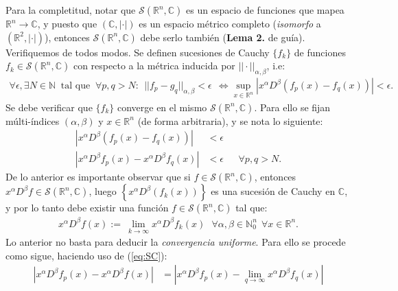 \documentclass[spanish, fleqn]{article}
\begin{document}
\begin{description}
\begin{enumerate}
        Para la completitud, notar que $\mathcal{S}(\mathbb{R}^n, \mathbb{C})$ es un espacio de funciones que mapea $\mathbb{R}^n \rightarrow \mathbb{C}$, y puesto que $(\mathbb{C},|\cdot|)$ es un espacio métrico completo  (\textit{isomorfo} a $\left(\mathbb{R}^2,|\cdot|\right)$), entonces $\mathcal{S}(\mathbb{R}^n, \mathbb{C})$ debe serlo también (\textbf{Lema 2.} de guía). Verifiquemos de todos modos. Se definen sucesiones de Cauchy $\{f_k \}$ de funciones $f_k \in \mathcal{S}(\mathbb{R}^n,\mathbb{C})$ con respecto a la métrica inducida por $||\cdot||_{\alpha,\beta}$, i.e:
        \begin{align}
          \forall \epsilon, \exists N \in \mathbb{N}\ \text{ tal que } \ \forall p,q > N: \ \ ||f_p-g_q||_{\alpha,\beta} < \epsilon \ \ \Leftrightarrow \sup_{x \in \mathbb{R}^n} |x^{\alpha}D^{\beta}(f_p(x)-f_q(x))|< \epsilon.
        \label{eq:SC}
        \end{align}
        Se debe verificar que $\{f_k \}$ converge en el mismo $\mathcal{S}(\mathbb{R}^n,\mathbb{C})$. Para ello se fijan múlti-índices $(\alpha, \beta)$ y $x \in \mathbb{R}^n$ (de forma arbitraria), y se nota lo siguiente:
        \begin{align*}
        	\left| x^{\alpha} D^{\beta} \left(f_p(x) - f_q(x) \right) \right| &< \epsilon \\
        	\left| x^{\alpha} D^{\beta} f_p(x) - x^{\alpha} D^{\beta} f_q(x) \right| &< \epsilon \ \ \ \ \ \ \ \forall p,q > N.
        \end{align*}
        De lo anterior es importante observar que si $f \in \mathcal{S}(\mathbb{R}^n, \mathbb{C})$, entonces $x^{\alpha} D^{\beta} f \in \mathcal{S}(\mathbb{R}^n, \mathbb{C})$,  luego $\left\{ x^{\alpha} D^{\beta} \left(f_k(x)\right) \right\}$ es una sucesión de Cauchy en $\mathbb{C}$, y por lo tanto debe existir una función $f \in \mathcal{S}(\mathbb{R}^n, \mathbb{C})$ tal que:
        \begin{align}
        	x^{\alpha}D^{\beta} f(x) := \ \lim_{k \rightarrow \infty} x^{\alpha}D^{\beta}f_k(x) \ \ \ \forall \alpha,\beta  \in \mathbb{N}_0^n \ \ \forall x \in \mathbb{R}^n.
        \end{align}
        Lo anterior no basta para deducir la \textit{convergencia uniforme}. Para ello se procede como sigue, haciendo uso de (\ref{eq:SC}):
        \begin{align*}
        	\left| x^{\alpha} D^{\beta} f_p(x) - x^{\alpha}D^{\beta} f(x) \right| &= \left| x^{\alpha} D^{\beta} f_p(x) - \lim_{q \rightarrow \infty} x^{\alpha}D^{\beta} f_q(x) \right| \\

\end{align*}
\end{enumerate}
\end{description}
\end{document}
